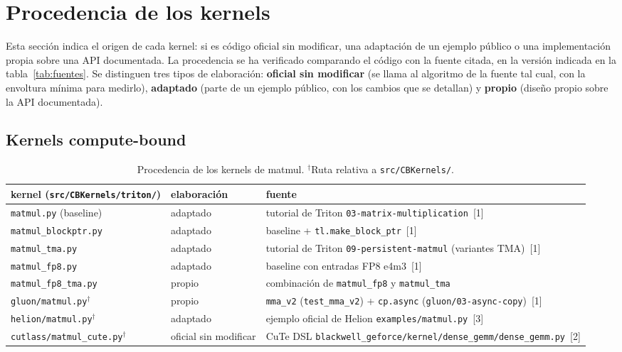 
\section{Procedencia de los kernels}
\label{sec:procedencia}

Esta sección indica el origen de cada kernel: si es código oficial sin modificar, una
adaptación de un ejemplo público o una implementación propia sobre una API documentada.
La procedencia se ha verificado comparando el código con la fuente citada, en la versión
indicada en la tabla~\ref{tab:fuentes}. Se distinguen tres tipos de elaboración:
\textbf{oficial sin modificar} (se llama al algoritmo de la fuente tal cual, con la
envoltura mínima para medirlo), \textbf{adaptado} (parte de un ejemplo público, con los
cambios que se detallan) y \textbf{propio} (diseño propio sobre la API documentada).

\subsection{Kernels compute-bound}

\begin{table}[htbp]
  \centering\small
  \begin{tabularx}{\linewidth}{llX}
    \toprule
    kernel (\texttt{src/CBKernels/triton/}) & elaboración & fuente \\
    \midrule
    \texttt{matmul.py} (baseline) & adaptado & tutorial de Triton \texttt{03-matrix-multiplication}~[1] \\
    \texttt{matmul\_blockptr.py} & adaptado & baseline + \texttt{tl.make\_block\_ptr}~[1] \\
    \texttt{matmul\_tma.py} & adaptado & tutorial de Triton \texttt{09-persistent-matmul} (variantes TMA)~[1] \\
    \texttt{matmul\_fp8.py} & adaptado & baseline con entradas FP8 e4m3~[1] \\
    \texttt{matmul\_fp8\_tma.py} & propio & combinación de \texttt{matmul\_fp8} y \texttt{matmul\_tma} \\
    \midrule
    \texttt{gluon/matmul.py}$^\dagger$ & propio & \texttt{mma\_v2} (\texttt{test\_mma\_v2}) + \texttt{cp.async} (\texttt{gluon/03-async-copy})~[1] \\
    \texttt{helion/matmul.py}$^\dagger$ & adaptado & ejemplo oficial de Helion \texttt{examples/matmul.py}~[3] \\
    \texttt{cutlass/matmul\_cute.py}$^\dagger$ & oficial sin modificar & CuTe DSL \texttt{blackwell\_geforce/kernel/dense\_gemm/dense\_gemm.py}~[2] \\
    \bottomrule
  \end{tabularx}
  \caption{Procedencia de los kernels de matmul. $^\dagger$Ruta relativa a \texttt{src/CBKernels/}.}
  \label{tab:procedencia-cb}
\end{table}


